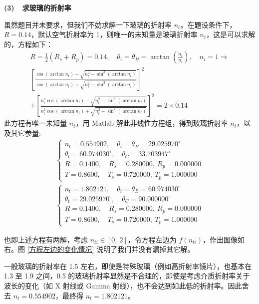 \documentclass[a4paper]{article}  %
\theoremstyle{MyLineTheoremStyle} %
\theoremstyle{MyBlockTheoremStyle} %
\theoremstyle{MySubsubsectionStyle} %
\begin{document}
\begin{multicols*}{4}
{\color{red} \textbf{(3)\ \ 求玻璃的折射率}}

虽然题目并未要求，但我们不妨求解一下玻璃的折射率 $n_t$。在题设条件下，$R = 0.14$，默认空气折射率为 1，则唯一的未知量是玻璃折射率 $n_t$，这是可以求解的，方程如下：
\begin{gather}\label{玻璃折射率}
    R = \frac{1}{2}(R_s + R_p) = 0.14,\quad \theta_i = \theta_B = \arctan\left(\frac{n_t}{n_i}\right) ,\quad n_i = 1
    \Longrightarrow 
    \\ 
    \left[ \frac{ \cos (\arctan n_t) - \sqrt{n_{t}^2 - \sin^2 (\arctan n_t)} }{\cos (\arctan n_t) + \sqrt{n_{t}^2 - \sin^2 (\arctan n_t)}} \right]^2 
    \\ 
    + \left[ \frac{ n_{t}^2\cos (\arctan n_t) - \sqrt{n_{t}^2 - \sin^2 (\arctan n_t)} }{n_{t}^2\cos (\arctan n_t) + \sqrt{n_{t}^2 - \sin^2 (\arctan n_t)}} \right]^2  = 2\times 0.14
\end{gather}
此方程有唯一未知量 $n_t$，用 Matlab 解此非线性方程组，得到玻璃折射率 $n_t$，以及其它参量: 
\begin{gather}
\begin{cases}
    n_t = 0.554902 
    ,\quad 
    \theta_i = \theta_B  = 29.025970^\circ
    \\
    \theta_t = 60.974030^\circ
    ,\quad 
    \theta_C = 33.703947^\circ
    \\
    R = 0.1400,\quad   R_s = 0.280000,\    R_p = 0.000000 \\ 
    T = 0.8600,\quad   T_s = 0.720000,\    T_p = 1.000000 
\end{cases} 
\\ 
\begin{cases}
    n_t = 1.802121
    ,\quad 
    \theta_i = \theta_B  = 60.974030^\circ 
    \\
    \theta_t = 29.025970^\circ
    ,\quad 
    \theta_C = 90.000000^\circ
    \\
    R = 0.1400,\quad   R_s = 0.280000,\    R_p = 0.000000 \\ 
    T = 0.8600,\quad   T_s = 0.720000,\    T_p = 1.000000 
\end{cases}
\end{gather}


也即上述方程有两解，考虑 $n_{ti} \in [0,\ 2]$，令方程左边为 $f(n_{ti})$，作出图像如右。图 \ref{方程左边的变化情况} 说明了我们并没有漏掉其它解。

一般玻璃的折射率在 1.5 左右，即使是特殊玻璃（例如高折射率镜片），也基本在 1.3 至 1.9 之间，0.5 的玻璃折射率显然是不合理的，即使是考虑介质折射率关于波长的变化（如 X 射线或 Gamma 射线），也不会达到如此低的折射率。因此舍去 $n_t = 0.554902$，最终得 $n_t = 1.802121$。


\end{multicols*}
\end{document}
